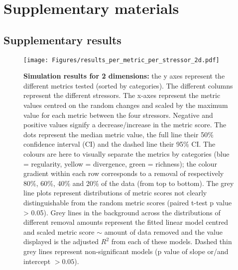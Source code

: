\documentclass[12pt,letterpaper]{article}
\begin{document}
\section{Supplementary materials}

\subsection{Supplementary results}

\begin{figure}[!htbp]
\centering
   \texttt{[image: Figures/results\_per\_metric\_per\_stressor\_2d.pdf]}
\caption{\scriptsize{\textbf{Simulation results for 2 dimensions:} the y axes represent the different metrics tested (sorted by categories).
The different columns represent the different stressors. The x-axes represent the metric values centred on the random changes and scaled by the maximum value for each metric between the four stressors.
Negative and positive values signify a decrease/increase in the metric score.
The dots represent the median metric value, the full line their 50\% confidence interval (CI) and the dashed line their 95\% CI.
The colours are here to visually separate the metrics by categories (blue = regularity, yellow = divergence, green = richness); the colour gradient within each row corresponds to a removal of respectively 80\%, 60\%, 40\% and 20\% of the data (from top to bottom).
The grey line plots represent distributions of metric scores not clearly distinguishable from the random metric scores (paired t-test p value > 0.05).
Grey lines in the background across the distributions of different removal amounts represent the fitted linear model centred and scaled metric score $\sim$ amount of data removed and the value displayed is the adjusted $R^2$ from each of these models.
Dashed thin grey lines represent non-significant models (p value of slope or/and intercept $> 0.05$).
}}
\label{Fig:simulation_results}
\end{figure}
\bigskip
\end{document}
